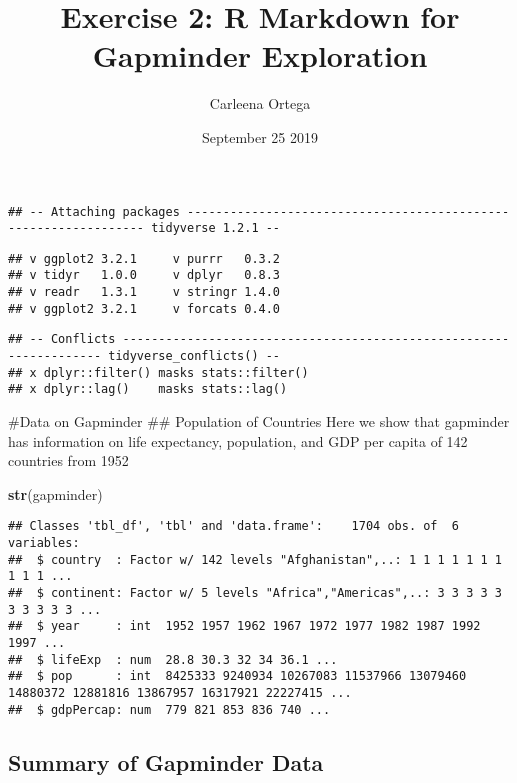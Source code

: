 \documentclass[]{article}
\title{Exercise 2: R Markdown for Gapminder Exploration}
\author{Carleena Ortega}
\date{September 25 2019}
\newenvironment{Shaded}{\begin{snugshade}}{\end{snugshade}}
\newcommand{\KeywordTok}[1]{\textcolor[rgb]{0.13,0.29,0.53}{\textbf{#1}}}
\newcommand{\NormalTok}[1]{#1}
\begin{document}
\maketitle

{
\setcounter{tocdepth}{2}
\tableofcontents
}
\begin{verbatim}
## -- Attaching packages ---------------------------------------------------------------- tidyverse 1.2.1 --
\end{verbatim}

\begin{verbatim}
## v ggplot2 3.2.1     v purrr   0.3.2
## v tidyr   1.0.0     v dplyr   0.8.3
## v readr   1.3.1     v stringr 1.4.0
## v ggplot2 3.2.1     v forcats 0.4.0
\end{verbatim}

\begin{verbatim}
## -- Conflicts ------------------------------------------------------------------- tidyverse_conflicts() --
## x dplyr::filter() masks stats::filter()
## x dplyr::lag()    masks stats::lag()
\end{verbatim}

\#Data on Gapminder \#\# Population of Countries Here we show that
gapminder has information on life expectancy, population, and GDP per
capita of 142 countries from 1952

\begin{Shaded}
\begin{Highlighting}[]
\KeywordTok{str}\NormalTok{(gapminder)}
\end{Highlighting}
\end{Shaded}

\begin{verbatim}
## Classes 'tbl_df', 'tbl' and 'data.frame':    1704 obs. of  6 variables:
##  $ country  : Factor w/ 142 levels "Afghanistan",..: 1 1 1 1 1 1 1 1 1 1 ...
##  $ continent: Factor w/ 5 levels "Africa","Americas",..: 3 3 3 3 3 3 3 3 3 3 ...
##  $ year     : int  1952 1957 1962 1967 1972 1977 1982 1987 1992 1997 ...
##  $ lifeExp  : num  28.8 30.3 32 34 36.1 ...
##  $ pop      : int  8425333 9240934 10267083 11537966 13079460 14880372 12881816 13867957 16317921 22227415 ...
##  $ gdpPercap: num  779 821 853 836 740 ...
\end{verbatim}

\hypertarget{summary-of-gapminder-data}{%
\subsection{Summary of Gapminder Data}\label{summary-of-gapminder-data}}
\end{document}
